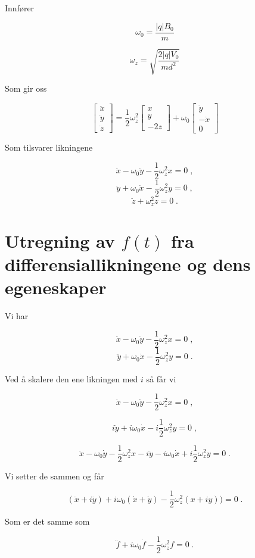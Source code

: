 \documentclass[reprint,english,notitlepage, nofootinbib]{revtex4-1}  %
\begin{document}
Innfører 

$$\omega_0 = \frac{|q|B_0}{m}$$

$$ \omega_z = \sqrt{\frac{2|q|V_0}{md^2}}$$

Som gir oss

$$\begin{bmatrix} \ddot{x} \\ \ddot{y} \\ \ddot{z} \end{bmatrix} = \frac{1}{2}\omega_z^2 \begin{bmatrix}
x \\ y \\ -2z 
\end{bmatrix} + \omega_0 \begin{bmatrix}
\dot{y} \\ -\dot{x} \\ 0
\end{bmatrix}$$ 

Som tilsvarer likningene

$$
\ddot{x} - \omega_0 \dot{y} - \frac{1}{2}\omega_z^2 x = 0 \; ,
$$
$$\ddot{y} + \omega_0 \dot{x} - \frac{1}{2}\omega_z^2 y = 0 \; ,
$$
$$\ddot{z} + \omega_z^2 z = 0 \; .
$$
\section{Utregning av $f(t)$ fra differensiallikningene og dens egeneskaper}\label{utfxy}

Vi har 

$$
\ddot{x} - \omega_0 \dot{y} - \frac{1}{2}\omega_z^2 x = 0 \; ,
$$
$$\ddot{y} + \omega_0 \dot{x} - \frac{1}{2}\omega_z^2 y = 0 \; .
$$

Ved å skalere den ene likningen med $i$ så får vi

$$\ddot{x} - \omega_0 \dot{y} - \frac{1}{2}\omega_z^2 x = 0 \; ,$$

$$i\ddot{y} + i\omega_0 \dot{x} - i\frac{1}{2}\omega_z^2 y = 0 \; ,$$

$$ \ddot{x} - \omega_0 \dot{y} - \frac{1}{2}\omega_z^2 x -i\ddot{y} - i\omega_0 \dot{x} + i\frac{1}{2}\omega_z^2 y = 0 \; .$$

Vi setter de sammen og får


$$(\ddot{x} + i\ddot{y}) + i\omega_0(\dot{x} + \dot{y}) - \frac{1}{2}\omega_z^2(x+iy) ) = 0 \; .$$
  
Som er det samme som

$$\ddot{f} + i\omega_0 \dot{f} - \frac{1}{2}\omega_z^2f = 0 \; .$$
\end{document}
